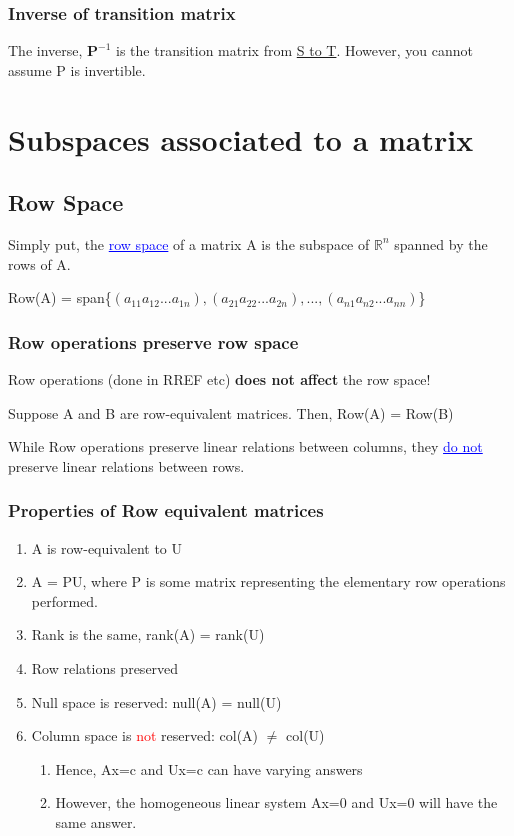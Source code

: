 \documentclass{article}
\newcommand{\bul}[1]{\textcolor{blue}{\underline{#1}}}
\begin{document}
\subsubsection{Inverse of transition matrix}
The inverse, $\textbf{P}^{-1}$ is the transition matrix from \underline{S to T}. However, you cannot assume P is invertible.

\section{Subspaces associated to a matrix}

\subsection{Row Space}
Simply put, the \bul{row space} of a matrix A is the subspace of $\mathbb{R}^n$ spanned by the rows of A.
\begin{center}
    Row(A) = span\{$(a_{11} a_{12} ... a_{1n}), (a_{21} a_{22} ... a_{2n}), ..., (a_{n1} a_{n2} ... a_{nn})$\}
\end{center}

\subsubsection{Row operations preserve row space}
Row operations (done in RREF etc) \textbf{does not affect} the row space!

Suppose A and B are row-equivalent matrices. Then, Row(A) = Row(B)

While Row operations preserve linear relations between columns, they \bul{do not} preserve linear relations between rows.

\subsubsection{Properties of Row equivalent matrices}
\begin{enumerate}
    \item A is row-equivalent to U
    \item A = PU, where P is some matrix representing the elementary row operations performed.
    \item Rank is the same, rank(A) = rank(U)
    \item Row relations preserved
    \item Null space is reserved: null(A) = null(U)
    \item Column space is \textcolor{red}{not} reserved: col(A) $\neq$ col(U)
    \begin{enumerate}
        \item Hence, Ax=c and Ux=c can have varying answers
        \item However, the homogeneous linear system Ax=0 and Ux=0 will have the same answer.
    \end{enumerate}
\end{enumerate}
\end{document}
